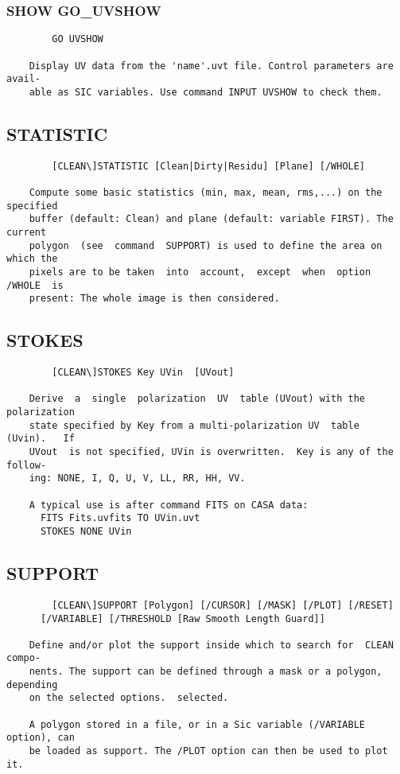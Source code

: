 \subsubsection{SHOW GO\_UVSHOW}
\begin{verbatim}
        GO UVSHOW

    Display UV data from the 'name'.uvt file. Control parameters are  avail-
    able as SIC variables. Use command INPUT UVSHOW to check them.

\end{verbatim}
\subsection{STATISTIC}
\begin{verbatim}
        [CLEAN\]STATISTIC [Clean|Dirty|Residu] [Plane] [/WHOLE]

    Compute some basic statistics (min, max, mean, rms,...) on the specified
    buffer (default: Clean) and plane (default: variable FIRST). The current
    polygon  (see  command  SUPPORT) is used to define the area on which the
    pixels are to be taken  into  account,  except  when  option  /WHOLE  is
    present: The whole image is then considered.

\end{verbatim}
\subsection{STOKES}
\begin{verbatim}
        [CLEAN\]STOKES Key UVin  [UVout]

    Derive  a  single  polarization  UV  table (UVout) with the polarization
    state specified by Key from a multi-polarization UV  table  (Uvin).   If
    UVout  is not specified, UVin is overwritten.  Key is any of the follow-
    ing: NONE, I, Q, U, V, LL, RR, HH, VV.

    A typical use is after command FITS on CASA data:
      FITS Fits.uvfits TO UVin.uvt
      STOKES NONE UVin

\end{verbatim}
\subsection{SUPPORT}
\begin{verbatim}
        [CLEAN\]SUPPORT [Polygon] [/CURSOR] [/MASK] [/PLOT] [/RESET]
      [/VARIABLE] [/THRESHOLD [Raw Smooth Length Guard]]

    Define and/or plot the support inside which to search for  CLEAN  compo-
    nents. The support can be defined through a mask or a polygon, depending
    on the selected options.  selected.

    A polygon stored in a file, or in a Sic variable (/VARIABLE option), can
    be loaded as support. The /PLOT option can then be used to plot it.


\end{verbatim}
